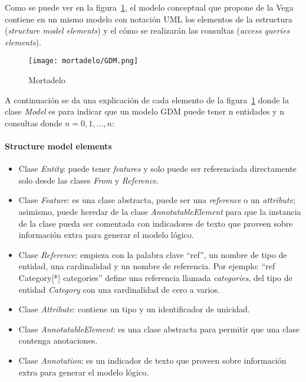 Como se puede ver en la figura~\ref{img:mortadelo-gdm}, el modelo conceptual que propone de la Vega contiene en un mismo modelo con notación UML los elementos de la estructura (\textit{structure model elements}) y el cómo se realizarán las consultas (\textit{access queries elements}).


\begin{figure}[h!t] 
    \centering
    \texttt{[image: mortadelo/GDM.png]}
    \caption{Mortadelo}
    \label{img:mortadelo-gdm}
\end{figure}

A continuación se da una explicación de cada elemento de la figura~\ref{img:mortadelo-gdm} donde la clase \textit{Model} es para indicar que un modelo GDM puede tener n entidades y n consultas donde $n=0,1,...,n$:

\paragraph*{Structure model elements}


\begin{itemize}    
    
    \item Clase \textit{Entity}: puede tener \textit{features} y solo puede ser referenciada directamente solo desde las clases \textit{From} y \textit{Reference}.
    \item Clase \textit{Feature}: es una clase abstracta, puede ser una \textit{reference} o un \textit{attribute}; asimismo, puede heredar de la clase \textit{AnnotatableElement} para que la instancia de la clase pueda ser comentada con indicadores de texto que proveen sobre información extra para generar el modelo lógico. 
    \item Clase \textit{Reference}: empieza con la palabra clave ``ref'', un nombre de tipo de entidad, una cardinalidad y un nombre de referencia. Por ejemplo: ``ref Category[*] categories'' define una referencia llamada \textit{categories}, del tipo de entidad \textit{Category} con una cardinalidad de cero a varios.
    \item Clase \textit{Attribute}: contiene un tipo y un identificador de unicidad.
    \item Clase \textit{AnnotatableElement}: es una clase abstracta para permitir que una clase contenga anotaciones.
    \item Clase \textit{Annotation}: es un indicador de texto que proveen sobre información extra para generar el modelo lógico.
    
\end{itemize}

